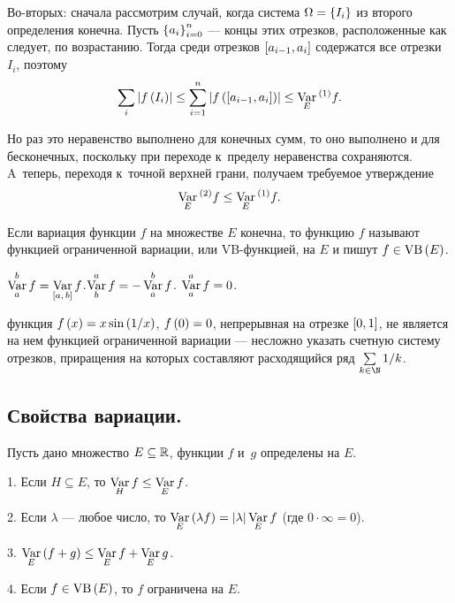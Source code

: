 \documentclass[draft]{article}
\begin{document}
Во-вторых: сначала рассмотрим случай, когда система
$\Omega=\left\{I_i\right\}$ из второго определения конечна. Пусть
$\left\{a_i\right\}_{i=0}^n$ --- концы этих отрезков, расположенные как
следует, по возрастанию. Тогда среди отрезков $\seg[a_{i-1},a_i]$
содержатся все отрезки $I_i$, поэтому
$$\sumi\abs{f\at(I_i)}\le\sum_{i=1}^n\abs{f\at(\seg[a_{i-1},a_i])}\le
\var_E{}^{ (1)}f.$$

Но раз это неравенство выполнено для конечных сумм, то оно выполнено
и для бесконечных, поскольку при переходе к~пределу неравенства
сохраняются. A~теперь, переходя к~точной верхней грани, получаем
требуемое утверждение
$$\mathop{\mathrm{Var}}\limits_E{}^{ (2)}f\le\mathop{\mathrm{Var}}\limits_E{}^{ (1)}f.$$

\preqdf

\bigskip

\df Если вариация функции $f$ на множестве $E$ конечна, то функцию
$f$ называют функцией ограниченной вариации, или VB-функцией, на $E$
и пишут $f\isvb\at(E)$.

\bigskip

\df
$\var_a^bf=\var_{\seg[a,\,b]}f$.\quad$\mathop{\mathrm{Var}}\limits_b^af=-\mathop{\mathrm{Var}}\limits_a^bf$.\quad
$\mathop{\mathrm{Var}}\limits_a^af=0$.

\bigskip

\ex функция $f\atx=x\sin\at(1/x)$, $f\at(0)=0$, непрерывная на
отрезке $\seg[0,1]$, не является на нем функцией ограниченной
вариации --- несложно указать счетную систему отрезков, приращения
на которых составляют расходящийся ряд $\sum\limits_{k\in\N}{1/k}$.

\eject

\subsection{Свойства вариации.}

\uts

\smallskip

Пусть дано множество $E\subseteq\mathbb{R}$, функции $f$ и~$g$
определены на $E$.

\smallskip
\smallskip

1. Если $H\subseteq E$, то $\mathop{\mathrm{Var}}\limits_Hf\le\mathop{\mathrm{Var}}\limits_Ef$.

\smallskip

2. Если $\lambda$ --- любое число, то $\var_E\at(\lambda
f)=\abs{\lambda}\var_Ef$ (где $0\cdot\infty=0$).

\smallskip

3. $\var_E\at(f+g)\le\var_Ef+\var_Eg$.

\smallskip

4. Если $f\isvb\at(E)$, то $f$ ограничена на $E$.
\end{document}
